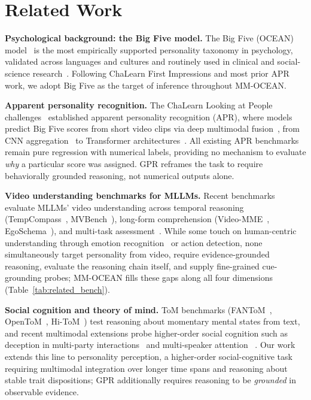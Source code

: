 \documentclass{llmxive}
\providecommand{\taskabbr}{GPR}
\providecommand{\benchname}{MM-OCEAN}
\begin{document}
\vspace{-0.2cm}
\section{Related Work}
\label{sec:related}

\vspace{-0.2cm}

\noindent\textbf{Psychological background: the Big Five model.}
The Big Five (OCEAN) model~\cite{mccrae1987validation,john2008paradigm} is the most empirically supported personality taxonomy in psychology, validated across languages and cultures and routinely used in clinical and social-science research~\cite{barrick1991bigfive}. Following ChaLearn First Impressions and most prior APR work, we adopt Big Five as the target of inference throughout \benchname{}.

\noindent\textbf{Apparent personality recognition.}
The ChaLearn Looking at People challenges~\cite{ponce2016chalearn,escalante2020modeling} established apparent personality recognition (APR), where models predict Big Five scores from short video clips via deep multimodal fusion~\cite{guclu2016deep}, from CNN aggregation~\cite{guclu2016deep} to Transformer architectures~\cite{saberi2026transformer}. All existing APR benchmarks remain pure regression with numerical labels, providing no mechanism to evaluate \emph{why} a particular score was assigned. \taskabbr{} reframes the task to require behaviorally grounded reasoning, not numerical outputs alone.

\noindent\textbf{Video understanding benchmarks for MLLMs.}
Recent benchmarks evaluate MLLMs' video understanding across temporal reasoning (TempCompass~\cite{liu2024tempcompass}, MVBench~\cite{li2024mvbench}), long-form comprehension (Video-MME~\cite{fu2024videomme}, EgoSchema~\cite{mangalam2023egoschema}), and multi-task assessment~\cite{fang2024mmbench}. While some touch on human-centric understanding through emotion recognition~\cite{poria2019meld} or action detection, none simultaneously target personality from video, require evidence-grounded reasoning, evaluate the reasoning chain itself, and supply fine-grained cue-grounding probes; \benchname{} fills these gaps along all four dimensions (Table~\ref{tab:related_bench}).

\noindent\textbf{Social cognition and theory of mind.}
ToM benchmarks (FANToM~\cite{kim2023fantom}, OpenToM~\cite{xu2024opentom}, Hi-ToM~\cite{wu2023hitom}) test reasoning about momentary mental states from text, and recent multimodal extensions probe higher-order social cognition such as deception in multi-party interactions~\cite{kang2025can} and multi-speaker attention ~\cite{ouyang2025multi,ouyang2026socialdirector}. 
Our work extends this line to personality perception, a higher-order social-cognitive task requiring multimodal integration over longer time spans and reasoning about stable trait dispositions; \taskabbr{} additionally requires reasoning to be \emph{grounded} in observable evidence.
\vspace{-0.2cm}
\end{document}
